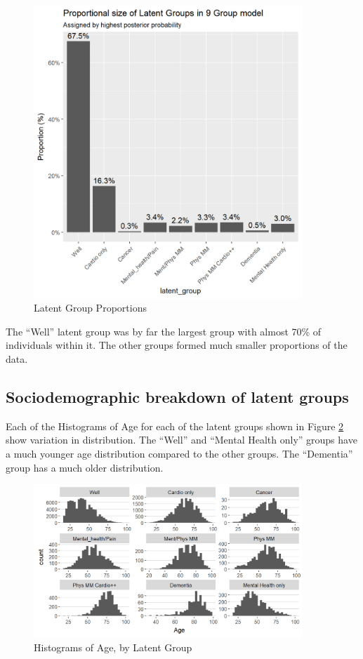 \documentclass[12pt,]{report}
\begin{document}
\begin{figure}
  \centering
    \includegraphics[width=0.9\textwidth]{figures/props.png}
  \caption{Latent Group Proportions}
  \label{fig:group-props}
\end{figure}

The ``Well'' latent group was by far the largest group with almost 70\%
of individuals within it. The other groups formed much smaller
proportions of the data.

\subsection{Sociodemographic breakdown of latent groups}\label{subsec:clust-ses}

Each of the Histograms of Age for each of the latent groups shown in
Figure \ref{fig:lg-by-age} show variation in distribution. The ``Well''
and ``Mental Health only'' groups have a much younger age distribution
compared to the other groups. The ``Dementia'' group has a much older
distribution.

\begin{figure}
  \centering
    \includegraphics[width=0.9\textwidth]{figures/lg-by-age.png}
  \caption{Histograms of Age, by Latent Group}
  \label{fig:lg-by-age}
\end{figure}
\end{document}

